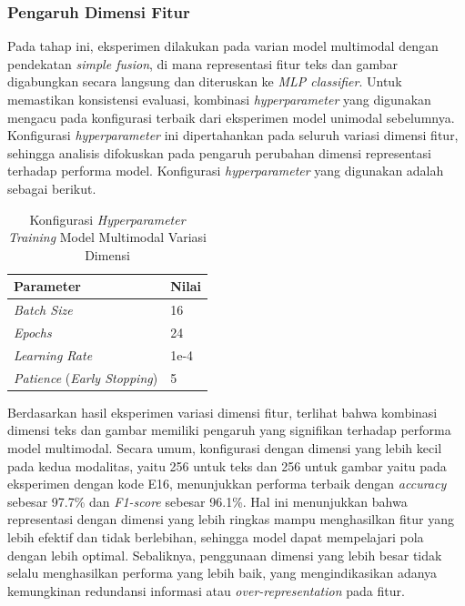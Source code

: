 \subsubsection{Pengaruh Dimensi Fitur}
\label{IV.Multimodal Dimensi}
Pada tahap ini, eksperimen dilakukan pada varian model multimodal dengan pendekatan \textit{simple fusion}, di mana representasi fitur teks dan gambar digabungkan secara langsung dan diteruskan ke \textit{MLP classifier}. Untuk memastikan konsistensi evaluasi, kombinasi \textit{hyperparameter} yang digunakan mengacu pada konfigurasi terbaik dari eksperimen model unimodal sebelumnya. Konfigurasi \textit{hyperparameter} ini dipertahankan pada seluruh variasi dimensi fitur, sehingga analisis difokuskan pada pengaruh perubahan dimensi representasi terhadap performa model. Konfigurasi \textit{hyperparameter} yang digunakan adalah sebagai berikut.

\begin{table}[H]
    \centering
    \caption{Konfigurasi \textit{Hyperparameter Training} Model Multimodal Variasi Dimensi}
    \label{table:hyperparams_terpilih}
    \small
    \setlength{\tabcolsep}{3pt}
    \renewcommand{\arraystretch}{1.1}
    \begin{tabular}{p{4.0cm} p{1.5cm}}
        \hline
        \textbf{Parameter} & \textbf{Nilai} \\
        \hline
        \textit{Batch Size} & 16 \\
        \textit{Epochs} & 24 \\
        \textit{Learning Rate} & 1e-4 \\
        \textit{Patience} (\textit{Early Stopping}) & 5 \\
        \hline
    \end{tabular}
\end{table}

Berdasarkan hasil eksperimen variasi dimensi fitur, terlihat bahwa kombinasi dimensi teks dan gambar memiliki pengaruh yang signifikan terhadap performa model multimodal. Secara umum, konfigurasi dengan dimensi yang lebih kecil pada kedua modalitas, yaitu 256 untuk teks dan 256 untuk gambar yaitu pada eksperimen dengan kode E16, menunjukkan performa terbaik dengan \textit{accuracy} sebesar 97.7\% dan \textit{F1-score} sebesar 96.1\%. Hal ini menunjukkan bahwa representasi dengan dimensi yang lebih ringkas mampu menghasilkan fitur yang lebih efektif dan tidak berlebihan, sehingga model dapat mempelajari pola dengan lebih optimal. Sebaliknya, penggunaan dimensi yang lebih besar tidak selalu menghasilkan performa yang lebih baik, yang mengindikasikan adanya kemungkinan redundansi informasi atau \textit{over-representation} pada fitur.

